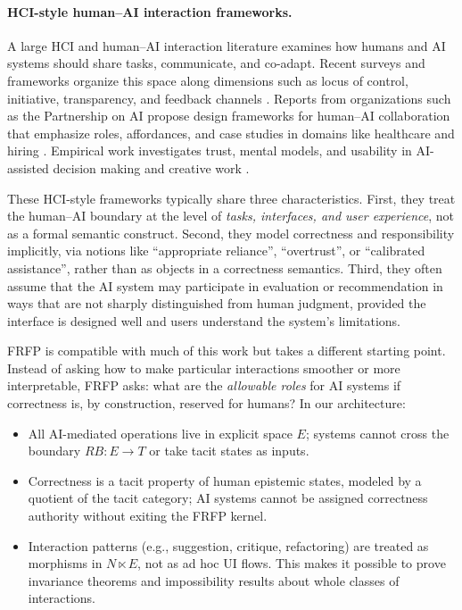 \documentclass[11pt]{article}
\theoremstyle{definition}
\begin{document}
\paragraph{HCI-style human--AI interaction frameworks.}
A large HCI and human--AI interaction literature examines how humans and AI systems should share tasks, communicate, and co-adapt. Recent surveys and frameworks organize this space along dimensions such as locus of control, initiative, transparency, and feedback channels \citep{jiang2024hci_research_agenda,gomez2025interaction_taxonomy,fragiadakis2024haic_evaluation}. Reports from organizations such as the Partnership on AI propose design frameworks for human--AI collaboration that emphasize roles, affordances, and case studies in domains like healthcare and hiring \citep{pai2021haic_framework}. Empirical work investigates trust, mental models, and usability in AI-assisted decision making and creative work \citep{sidra2025generative_haic_health,haicSurvey2024}.

These HCI-style frameworks typically share three characteristics. First, they treat the human--AI boundary at the level of \emph{tasks, interfaces, and user experience}, not as a formal semantic construct. Second, they model correctness and responsibility implicitly, via notions like ``appropriate reliance'', ``overtrust'', or ``calibrated assistance'', rather than as objects in a correctness semantics. Third, they often assume that the AI system may participate in evaluation or recommendation in ways that are not sharply distinguished from human judgment, provided the interface is designed well and users understand the system's limitations.

FRFP is compatible with much of this work but takes a different starting point. Instead of asking how to make particular interactions smoother or more interpretable, FRFP asks: what are the \emph{allowable roles} for AI systems if correctness is, by construction, reserved for humans? In our architecture:

\begin{itemize}
  \item All AI-mediated operations live in explicit space $E$; systems cannot cross the boundary $RB : E \to T$ or take tacit states as inputs.
  \item Correctness is a tacit property of human epistemic states, modeled by a quotient of the tacit category; AI systems cannot be assigned correctness authority without exiting the FRFP kernel.
  \item Interaction patterns (e.g., suggestion, critique, refactoring) are treated as morphisms in $N \ltimes E$, not as ad hoc UI flows. This makes it possible to prove invariance theorems and impossibility results about whole classes of interactions.
\end{itemize}
\end{document}
